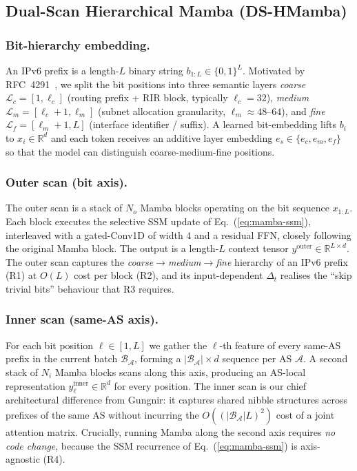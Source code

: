 \documentclass[conference]{IEEEtran}
\begin{document}
\subsection{Dual-Scan Hierarchical Mamba (DS-HMamba)}
\label{sec:design:model}

\subsubsection{Bit-hierarchy embedding.}
An IPv6 prefix is a length-$L$ binary string
$b_{1:L}\!\in\!\{0,1\}^{L}$.  Motivated by
RFC~4291~\cite{hinden2006rfc4291}, we split the bit positions
into three semantic layers
\emph{coarse} $\mathcal{L}_c\!=\![1,\ell_c]$
(routing prefix + RIR block, typically $\ell_c\!=\!32$),
\emph{medium} $\mathcal{L}_m\!=\![\ell_c\!+\!1,\ell_m]$
(subnet allocation granularity, $\ell_m\!\approx\!48\text{--}64$),
and \emph{fine} $\mathcal{L}_f\!=\![\ell_m\!+\!1,L]$
(interface identifier / suffix).  A learned bit-embedding
lifts $b_i$ to $x_i\!\in\!\mathbb{R}^{d}$ and each token receives
an additive layer embedding
$e_s\!\in\!\{e_c,e_m,e_f\}$ so that the model can distinguish
coarse-medium-fine positions.

\subsubsection{Outer scan (bit axis).}
The outer scan is a stack of $N_o$ Mamba blocks operating on
the bit sequence $x_{1:L}$.  Each block executes the
selective SSM update of Eq.~(\ref{eq:mamba-ssm}), interleaved
with a gated-Conv1D of width $4$ and a residual FFN, closely
following the original Mamba block.  The output is a
length-$L$ context tensor
$y^{\text{outer}}\!\in\!\mathbb{R}^{L\times d}$.
The outer scan captures the
\emph{coarse$\rightarrow$medium$\rightarrow$fine} hierarchy
of an IPv6 prefix (R1) at $O(L)$ cost per block (R2), and its
input-dependent $\Delta_t$ realises the ``skip trivial bits''
behaviour that R3 requires.

\subsubsection{Inner scan (same-AS axis).}
For each bit position $\ell\!\in\![1,L]$ we gather the
$\ell$-th feature of every same-AS prefix in the current batch
$\mathcal{B}_{\mathcal{A}}$, forming a
$|\mathcal{B}_{\mathcal{A}}|\!\times\!d$ sequence per AS
$\mathcal{A}$.  A second stack of $N_i$ Mamba blocks scans
along this axis, producing an AS-local representation
$y^{\text{inner}}_{\ell}\!\in\!\mathbb{R}^{d}$ for every
position.  The inner scan is our chief architectural
difference from Gungnir: it captures shared nibble structures
across prefixes of the same AS without incurring the
$O((|\mathcal{B}_{\mathcal{A}}|L)^2)$ cost of a joint attention
matrix.  Crucially, running Mamba along the second axis
requires \emph{no code change}, because the SSM recurrence
of Eq.~(\ref{eq:mamba-ssm}) is axis-agnostic (R4).
\end{document}
